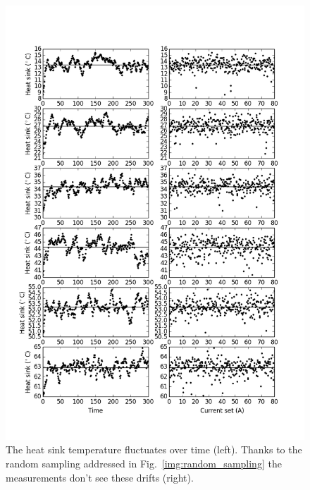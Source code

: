 \begin{figure}
\centering
\includegraphics[width=15cm]{img/random_sampling_heatsink.png}
\caption{The heat sink temperature fluctuates over time (left).
Thanks to the random sampling addressed in Fig.~\ref{img:random_sampling}
the measurements don't see these drifts (right).}
\label{img:random_sampling_heatsink}
\end{figure}

